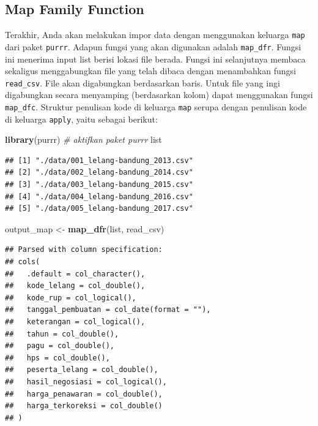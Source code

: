 \documentclass[]{book}
\newenvironment{Shaded}{\begin{snugshade}}{\end{snugshade}}
\newcommand{\KeywordTok}[1]{\textcolor[rgb]{0.13,0.29,0.53}{\textbf{#1}}}
\newcommand{\StringTok}[1]{\textcolor[rgb]{0.31,0.60,0.02}{#1}}
\newcommand{\CommentTok}[1]{\textcolor[rgb]{0.56,0.35,0.01}{\textit{#1}}}
\newcommand{\NormalTok}[1]{#1}
\begin{document}
\subsection{Map Family Function}\label{map-family-function}

Terakhir, Anda akan melakukan impor data dengan menggunakan keluarga
\texttt{map} dari paket \texttt{purrr}. Adapun fungsi yang akan
digunakan adalah \texttt{map\_dfr}. Fungsi ini menerima input list
berisi lokasi file berada. Fungsi ini selanjutnya membaca sekaligus
menggabungkan file yang telah dibaca dengan menambahkan fungsi
\texttt{read\_csv}. File akan digabungkan berdasarkan baris. Untuk file
yang ingi digabungkan secara menyamping (berdasarkan kolom) dapat
menggunakan fungsi \texttt{map\_dfc}. Struktur penulisan kode di
keluarga \texttt{map} serupa dengan penulisan kode di keluarga
\texttt{apply}, yaitu sebagai berikut:

\begin{Shaded}
\begin{Highlighting}[]
\KeywordTok{library}\NormalTok{(purrr) }\CommentTok{# aktifkan paket purrr}
\NormalTok{list}
\end{Highlighting}
\end{Shaded}

\begin{verbatim}
## [1] "./data/001_lelang-bandung_2013.csv"
## [2] "./data/002_lelang-bandung_2014.csv"
## [3] "./data/003_lelang-bandung_2015.csv"
## [4] "./data/004_lelang-bandung_2016.csv"
## [5] "./data/005_lelang-bandung_2017.csv"
\end{verbatim}

\begin{Shaded}
\begin{Highlighting}[]
\NormalTok{output_map <-}\StringTok{ }\KeywordTok{map_dfr}\NormalTok{(list, read_csv)}
\end{Highlighting}
\end{Shaded}

\begin{verbatim}
## Parsed with column specification:
## cols(
##   .default = col_character(),
##   kode_lelang = col_double(),
##   kode_rup = col_logical(),
##   tanggal_pembuatan = col_date(format = ""),
##   keterangan = col_logical(),
##   tahun = col_double(),
##   pagu = col_double(),
##   hps = col_double(),
##   peserta_lelang = col_double(),
##   hasil_negosiasi = col_logical(),
##   harga_penawaran = col_double(),
##   harga_terkoreksi = col_double()
## )
\end{verbatim}
\end{document}
